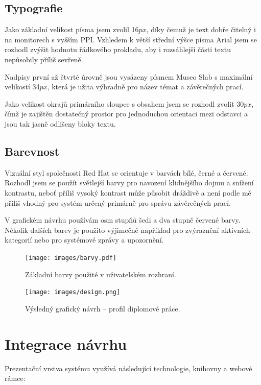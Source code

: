 \subsection{Typografie}

Jako základní velikost písma jsem zvolil 16$px$, díky čemuž je text dobře čitelný i na monitorech s vyšším PPI. Vzhledem k větší střední výšce písma Arial jsem se rozhodl zvýšit hodnotu řádkového prokladu, aby i rozsáhlejší části textu nepůsobily příliš sevřeně.

Nadpisy první až čtvrté úrovně jsou vysázeny písmem Museo Slab s maximální velikostí 34$px$, která je užita výhradně pro název témat a závěrečných prací.

Jako velikost okrajů primárního sloupce s obsahem jsem se rozhodl zvolit 30$px$, čímž je zajištěn dostatečný prostor pro jednoduchou orientaci mezi odstavci a jsou tak jasně odlišeny bloky textu.

\subsection{Barevnost}

Vizuální styl společnosti Red Hat se orientuje v barvách bílé, černé a červené. Rozhodl jsem se použít světlejší barvy pro navození klidnějšího dojmu a snížení kontrastu, neboť příliš vysoký kontrast může působit dráždivě a není podle mě příliš vhodný pro systém určený primárně pro správu závěrečných prací.

V grafickém návrhu používám osm stupňů šedi a dva stupně červené barvy. Několik dalších barev je použito výjimečně například pro zvýraznění aktivních kategorií nebo pro systémové zprávy a upozornění.

\begin{figure}[htbp]
    \centering
    \texttt{[image: images/barvy.pdf]}
    \caption{Základní barvy použité v uživatelském rozhraní.}
    \label{img:colors}
\end{figure}

\begin{figure}[htbp]
    \centering
    \texttt{[image: images/design.png]}
    \caption{Výsledný grafický návrh -- profil diplomové práce.}
    \label{img:design}
\end{figure}

\section{Integrace návrhu}

Prezentační vrstva systému využívá následující technologie, knihovny a webové rámce:

